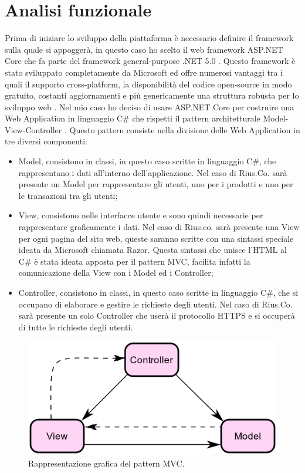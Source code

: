 \section{Analisi funzionale}
Prima di iniziare lo sviluppo della piattaforma è necessario definire il framework sulla quale si appoggerà, in questo caso ho scelto il web framework ASP.NET Core che fa parte del framework general-purpose .NET 5.0 \cite{NET5.0}. Questo framework è stato sviluppato completamente da Microsoft ed offre numerosi vantaggi tra i quali il supporto cross-platform, la disponibilità del codice open-source in modo gratuito, costanti aggiornamenti e più genericamente una struttura robusta per lo sviluppo web \cite{ASP.NETCore}. Nel mio caso ho deciso di usare ASP.NET Core per costruire una Web Application in linguaggio C\# che rispetti il pattern architetturale Model-View-Controller \cite{MVC}. Questo pattern consiste nella divisione delle Web Application in tre diversi componenti: 
\begin{itemize}
    \item Model, consistono in classi, in questo caso scritte in linguaggio C\#, che rappresentano i dati all'interno dell'applicazione. Nel caso di Rius.Co. sarà presente un Model per rappresentare gli utenti, uno per i prodotti e uno per le transazioni tra gli utenti;
    \item View, consistono nelle interfacce utente e sono quindi necessarie per rappresentare graficamente i dati. Nel caso di Rius.co. sarà presente una View per ogni pagina del sito web, queste saranno scritte con una sintassi speciale ideata da Microsoft chiamata Razor. Questa sintassi che unisce l'HTML al C\# è stata ideata apposta per il pattern MVC, facilita infatti la comunicazione della View con i Model ed i Controller;
    \item Controller, consistono in classi, in questo caso scritte in linguaggio C\#, che si occupano di elaborare e gestire le richieste degli utenti. Nel caso di Rius.Co. sarà presente un solo Controller che userà il protocollo HTTPS e si occuperà di tutte le richieste degli utenti.
\end{itemize}
\begin{figure}[ht]
    \centering\includegraphics[scale=0.3]{images/MVC.png}
    \caption{Rappresentazione grafica del pattern MVC.}
\end{figure}

